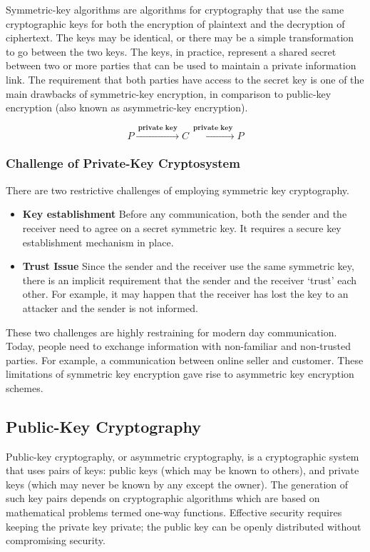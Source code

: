 \documentclass[british]{article}
\begin{document}
Symmetric-key algorithms are algorithms for cryptography that use
the same cryptographic keys for both the encryption of plaintext and
the decryption of ciphertext. The keys may be identical, or there
may be a simple transformation to go between the two keys. The keys,
in practice, represent a shared secret between two or more parties
that can be used to maintain a private information link. The requirement
that both parties have access to the secret key is one of the main
drawbacks of symmetric-key encryption, in comparison to public-key
encryption (also known as asymmetric-key encryption).

\[
	P\xrightarrow{\:\textbf{private key}\:}C\xrightarrow{\:\textbf{private key}\:}P
\]

\medskip{}


\subsubsection{Challenge of Private-Key Cryptosystem}

There are two restrictive challenges of employing symmetric key cryptography.
\begin{itemize}
	\item \textbf{Key establishment \textminus{}} Before any communication,
	      both the sender and the receiver need to agree on a secret symmetric
	      key. It requires a secure key establishment mechanism in place.
	\item \textbf{Trust Issue \textminus{}} Since the sender and the receiver
	      use the same symmetric key, there is an implicit requirement that
	      the sender and the receiver `trust' each other. For example, it
	      may happen that the receiver has lost the key to an attacker and the
	      sender is not informed.
\end{itemize}
These two challenges are highly restraining for modern day communication.
Today, people need to exchange information with non-familiar and non-trusted
parties. For example, a communication between online seller and customer.
These limitations of symmetric key encryption gave rise to asymmetric
key encryption schemes.

\subsection{Public-Key Cryptography}

Public-key cryptography, or asymmetric cryptography, is a cryptographic
system that uses pairs of keys: public keys (which may be known to
others), and private keys (which may never be known by any except
the owner). The generation of such key pairs depends on cryptographic
algorithms which are based on mathematical problems termed one-way
functions. Effective security requires keeping the private key private;
the public key can be openly distributed without compromising security.
\end{document}

